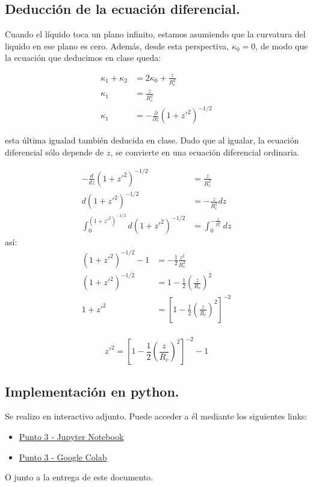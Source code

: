 \subsection{Deducción de la ecuación diferencial.}
    Cuando el líquido toca un plano infinito, estamos asumiendo que la curvatura del liquido en ese plano es cero. Además, desde esta perspectiva, $\kappa_0 = 0$, de modo que la ecuación que deducimos en clase queda:

    \begin{align*}
        \kappa_1 + \kappa_2 &= 2\kappa_0 + \frac{z}{R_c^2}\\
        \kappa_1  &= \frac{z}{R_c^2} \\
        \kappa_1 &= - \frac{\partial}{\partial z} (1 + z'^2)^{-1/2}
    \end{align*}

    esta última igualad también deducida en clase. Dado que al igualar, la ecuación diferencial sólo depende de $z$, se convierte en una ecuación diferencial ordinaria.

    \begin{align*}
        -\frac{d}{dz}(1 + z'^2)^{-1/2} &= \frac{z}{R_c^2} \\
        d(1 + z'^2)^{-1/2} &= -\frac{z}{R_c^2} dz \\
        \int_{0}^{(1+z'^2)^{-1/2}} d(1 + z'^2)^{-1/2} &= \int_{0}^{-\frac{z}{R_c^2}} dz 
    \end{align*}
    así:
    \begin{align*}
        (1 + z'^2)^{-1/2} - 1 &= -\frac{1}{2} \frac{z^2}{R_c^2} \\
        (1 + z'^2)^{-1/2} &= 1 -\frac{1}{2} \left(\frac{z}{R_c}\right)^2 \\
        1 + z'^2 &= \left[ 1 -\frac{1}{2} \left(\frac{z}{R_c}\right)^2 \right]^{-2} \\
    \end{align*}

    \begin{equation}
        \boxed{z'^2 = \left[ 1 -\frac{1}{2} \left(\frac{z}{R_c}\right)^2 \right]^{-2} - 1 }
    \end{equation}

\subsection{Implementación en python.}

    Se realizo en interactivo adjunto. Puede acceder a él mediante los siguientes links:

    \begin{itemize}
        \item \href{https://github.com/lldddv2/Medios_continuos_Tarea1/blob/main/punto_3.ipynb}{Punto 3 - Jupyter Notebook}
        \item \href{https://colab.research.google.com/github/lldddv2/Medios_continuos_Tarea1/blob/main/punto_3.ipynb}{Punto 3 - Google Colab}
    \end{itemize}

    O junto  a la entrega de este documento.